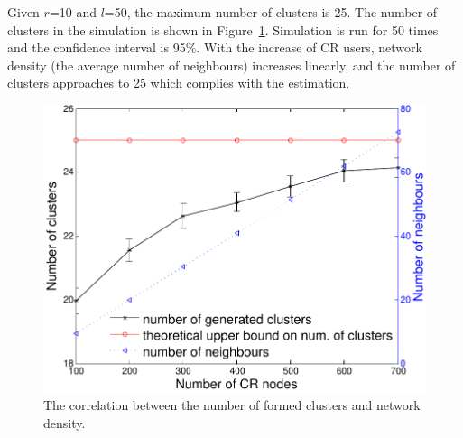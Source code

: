\documentclass[times]{ettauth}
\theoremstyle{mytheoremstyle}
\theoremstyle{mytheoremstyle}
\theoremstyle{mytheoremstyle}
\begin{document}
Given $r$=10 and $l$=50, the maximum number of clusters is 25.
The number of clusters in the simulation is shown in Figure~\ref{number_clusters_scale}.
Simulation is run for 50 times and the confidence interval is 95\%.
With the increase of CR users, network density (the average number of neighbours) increases linearly, and the number of clusters approaches to 25 which complies with the estimation.

\begin{figure}[h]
  \centering
  \includegraphics[width=0.7\linewidth]{number_clusters_upperBound.pdf}
  \caption{The correlation between the number of formed clusters and network density.}
  \label{number_clusters_scale}
\end{figure}
\end{document}
